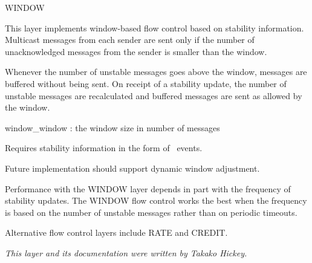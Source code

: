 %
%
%
\begin{Layer}{WINDOW} 

This layer implements window-based flow control based on stability information.
Multicast messages from each sender are sent only if the number of
unacknowledged messages from the sender is smaller than the window.

\begin{Protocol}
Whenever the number of unstable messages goes above the window, messages
are buffered without being sent.  On receipt of a stability update, the
number of unstable messages are recalculated and buffered messages are sent
as allowed by the window.
\end{Protocol}

\begin{Parameters}
\item window\_window : the window size in number of messages
\end{Parameters}

\begin{Properties}
\item
Requires stability information in the form of \UpStable\ events.
\end{Properties}

\begin{Notes}
\item 
Future implementation should support dynamic window adjustment.
\item 
Performance with the WINDOW layer depends in part with the frequency of
stability updates.  The WINDOW flow control works the best when the
frequency is based on the number of unstable messages rather than on
periodic timeouts.
\item 
Alternative flow control layers include RATE and CREDIT.
\end{Notes}

\begin{Sources}
\end{Sources}

\emph{This layer and its documentation were written by Takako Hickey.}
\end{Layer}
